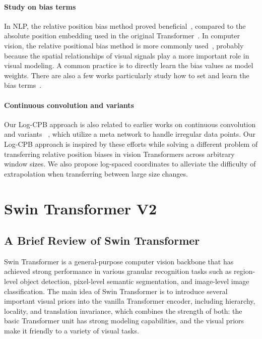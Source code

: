 \documentclass[10pt,twocolumn,letterpaper]{article}
\begin{document}
\paragraph{Study on bias terms} In NLP, the relative position bias method proved beneficial~\cite{raffel2019t5}, compared to the absolute position embedding used in the original Transformer~\cite{vaswani2017attention}. In computer vision, the relative positional bias method is more commonly used~\cite{hu2019localrelation, liu2021swin, yang2021focal}, probably because the spatial relationships of visual signals play a more important role in visual modeling. A common practice is to directly learn the bias values as model weights. There are also a few works particularly study how to set and learn the bias terms~\cite{ke2021rethinking, wu2021rethinking}. 

\paragraph{Continuous convolution and variants} Our Log-CPB approach is also related to earlier works on continuous convolution and variants ~\cite{schutt2017schnet,wang2018continuousconvcvpr,hu2018relation,liu2020closer}, which utilize a meta network to handle irregular data points. Our Log-CPB approach is inspired by these efforts while solving a different problem of transferring relative position biases in vision Transformers across arbitrary window sizes. We also propose log-spaced coordinates to alleviate the difficulty of extrapolation when transferring between large size changes.

\section{Swin Transformer V2}

\subsection{A Brief Review of Swin Transformer}

\label{sec.swin_v1}

Swin Transformer is a general-purpose computer vision backbone that has achieved strong performance in various granular recognition tasks such as region-level object detection, pixel-level semantic segmentation, and image-level image classification. The main idea of Swin Transformer is to introduce several important visual priors into the vanilla Transformer encoder, including hierarchy, locality, and translation invariance, which combines the strength of both: the basic Transformer unit has strong modeling capabilities, and the visual priors make it friendly to a variety of visual tasks. 
\end{document}
